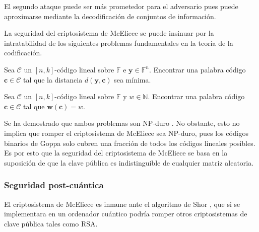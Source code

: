 El segundo ataque puede ser más prometedor para el adversario pues puede aproximarse mediante la decodificación de conjuntos de información.

La seguridad del criptosistema de McEliece se puede insinuar por la intratabilidad de los siguientes problemas fundamentales en la teoría de la codificación.

\begin{problemth}
    Sea $\mathcal{C}$ un $[n, k]$-código lineal sobre $\mathbb{F}$ e $\textbf{y} \in \mathbb{F}^n$. Encontrar una palabra código $\textbf{c} \in \mathcal{C}$ tal que la distancia $d(\textbf{y}, \textbf{c})$ sea mínima.
\end{problemth}

\begin{problemth}
    Sea $\mathcal{C}$ un $[n, k]$-código lineal sobre $\mathbb{F}$ y $w \in \mathbb{N}$. Encontrar una palabra código $\textbf{c} \in \mathcal{C}$ tal que $\textbf{w}(\textbf{c}) = w$.
\end{problemth}

Se ha demostrado que ambos problemas son NP-duro \cite{Intractability_coding_problems}. No obstante, esto no implica que romper el criptosistema de McEliece sea NP-duro, pues los códigos binarios de Goppa solo cubren una fracción de todos los códigos lineales posibles. Es por esto que la seguridad del criptosistema de McEliece se basa en la suposición de que la clave pública es indistinguible de cualquier matriz aleatoria.

\subsubsection{Seguridad post-cuántica}

El criptosistema de McEliece es inmune ante el algoritmo de Shor \cite{Shor_1997}, que si se implementara en un ordenador cuántico podría romper otros criptosistemas de clave pública tales como RSA. 